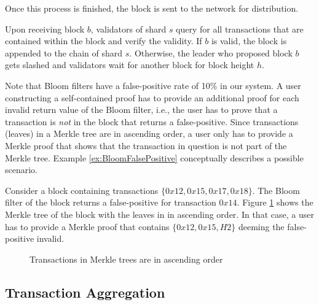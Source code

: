 Once this process is finished, the block is sent to the network for distribution.

Upon receiving block $b$, validators of shard $s$ query for all transactions that are contained within the block and verify the validity. If $b$ is valid, the block is appended to the chain of shard $s$. Otherwise, the leader who proposed block $b$ gets slashed and validators wait for another block for block height $h$.

Note that Bloom filters have a false-positive rate of 10\% in our system. A user constructing a self-contained proof has to provide an additional proof for each invalid return value of the Bloom filter, i.e., the user has to prove that a transaction is \textit{not} in the block that returns a false-positive. Since transactions (leaves) in a Merkle tree are in ascending order, a user only has to provide a Merkle proof that shows that the transaction in question is not part of the Merkle tree. Example \ref{ex:BloomFalsePositive} conceptually describes a possible scenario.

\begin{example}
\label{ex:BloomFalsePositive}
Consider a block containing transactions $\{0x12, 0x15, 0x17, 0x18\}$. The Bloom filter of the block returns a false-positive for transaction $0x14$. Figure \ref{fig:BloomFalsePositive} shows the Merkle tree of the block with the leaves in in ascending order. In that case, a user has to provide a Merkle proof that contains $\{0x12, 0x15, H2\}$ deeming the false-positive invalid.
\begin{figure}[hbt]
\centering
{}  
\caption{Transactions in Merkle trees are in ascending order\label{fig:BloomFalsePositive}}
\end{figure}  
\end{example}

\subsection{Transaction Aggregation}
\label{Design:TransactionAggregation}

